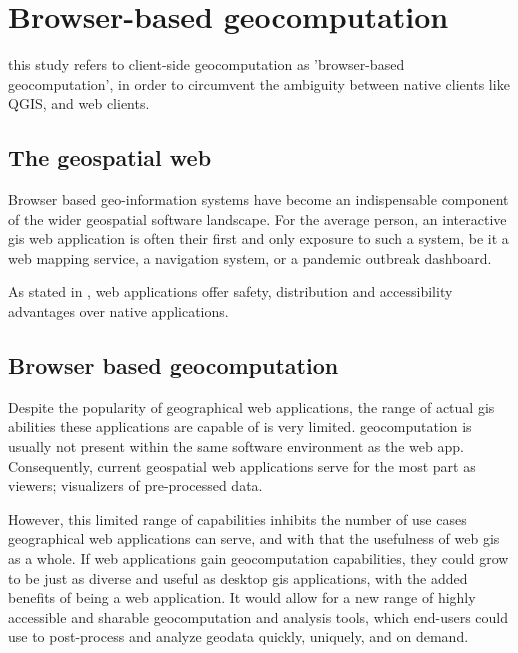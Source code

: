 
\section{Browser-based geocomputation}
\label{sec:related-geoweb}

this study refers to client-side geocomputation as 'browser-based geocomputation', in order to circumvent the ambiguity between native clients like QGIS, and web clients. 

\subsection{The geospatial web}

Browser based geo-information systems have become an indispensable component of the wider geospatial software landscape. 
For the average person, an interactive \ac{gis} web application is often their first and only exposure to such a system, be it a web mapping service, a navigation system, or a pandemic outbreak dashboard. 

As stated in , web applications offer safety, distribution and accessibility advantages over native applications.

\subsection{Browser based geocomputation}

Despite the popularity of geographical web applications, the range of actual \ac{gis} abilities these applications are capable of is very limited. \ac{geocomputation} is usually not present within the same software environment as the web app. Consequently, current geospatial web applications serve for the most part as viewers; visualizers of pre-processed data. 

However, this limited range of capabilities inhibits the number of use cases geographical web applications can serve, and with that the usefulness of web \ac{gis} as a whole.
If web applications gain \ac{geocomputation} capabilities, they could grow to be just as diverse and useful as desktop \ac{gis} applications, with the added benefits of being a web application. It would allow for a new range of highly accessible and sharable geocomputation and analysis tools, which end-users could use to post-process and analyze geodata quickly, uniquely, and on demand.


